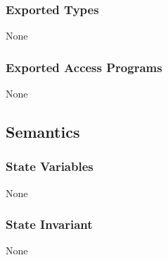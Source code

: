 \documentclass[12pt, titlepage]{article}
\begin{document}
\subsubsection* {Exported Types}

None

\subsubsection* {Exported Access Programs}

None

\subsection* {Semantics}

\subsubsection* {State Variables}

None

\subsubsection* {State Invariant}

None

\newpage
\end{document}
